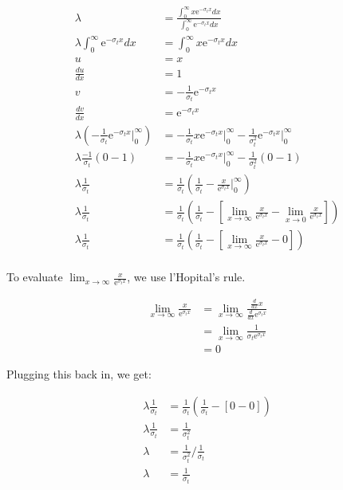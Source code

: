 \documentclass{hw}
\begin{document}
\solution
    \begin{align*}
        \lambda &= \frac{\int_0^\infty x \mathrm{e}^{-\sigma_t x} dx }{\int_0^\infty \mathrm{e}^{-\sigma_t x} dx} \\
        \lambda \int_0^\infty \mathrm{e}^{-\sigma_t x} dx &= \int_0^\infty x \mathrm{e}^{-\sigma_t x} dx \\
        u &= x \\
        \frac{du}{dx} &= 1 \\
        v &= -\frac{1}{\sigma_t} \mathrm{e}^{-\sigma_t x} \\
        \frac{dv}{dx} &= \mathrm{e}^{-\sigma_t x} \\
        \lambda \left(-\frac{1}{\sigma_t} \mathrm{e}^{-\sigma_t x} \Big|_0^\infty\right) &= -\frac{1}{\sigma_t} x \mathrm{e}^{-\sigma_t x}\Big|_0^\infty - \frac{1}{\sigma_t^2}\mathrm{e}^{-\sigma_t x}\Big|_0^\infty \\
        \lambda \frac{-1}{\sigma_t} \left( 0 - 1 \right) &= -\frac{1}{\sigma_t} x \mathrm{e}^{-\sigma_t x}\Big|_0^\infty - \frac{1}{\sigma_t^2} \left( 0 - 1 \right) \\
        \lambda \frac{1}{\sigma_t} &= \frac{1}{\sigma_t} \left( \frac{1}{\sigma_t} - \frac{x}{\mathrm{e}^{\sigma_t x}}\Big|_0^\infty \right) \\
        \lambda \frac{1}{\sigma_t} &= \frac{1}{\sigma_t} \left( \frac{1}{\sigma_t} - \left[ \lim_{x\to\infty}\frac{x}{\mathrm{e}^{\sigma_t x}} - \lim_{x\to0}\frac{x}{\mathrm{e}^{\sigma_t x}} \right] \right) \\
        \lambda \frac{1}{\sigma_t} &= \frac{1}{\sigma_t} \left( \frac{1}{\sigma_t} - \left[ \lim_{x\to\infty}\frac{x}{\mathrm{e}^{\sigma_t x}} - 0 \right] \right) \\
    \end{align*}

    To evaluate $\lim_{x\to\infty}\frac{x}{\mathrm{e}^{\sigma_t x}}$, we use l'Hopital's rule.

    \begin{align*}
        \lim_{x\to\infty}\frac{x}{\mathrm{e}^{\sigma_t x}} &= \lim_{x\to\infty}\frac{\frac{d}{dx}x}{\frac{d}{dx}\mathrm{e}^{\sigma_t x}} \\
        &= \lim_{x\to\infty}\frac{1}{\sigma_t \mathrm{e}^{\sigma_t x}} \\
        &= 0
    \end{align*}

    Plugging this back in, we get:

    \begin{align*}
        \lambda \frac{1}{\sigma_t} &= \frac{1}{\sigma_t} \left( \frac{1}{\sigma_t} - \left[ 0 - 0 \right] \right) \\
        \lambda \frac{1}{\sigma_t} &= \frac{1}{\sigma_t^2} \\
        \lambda &= {\frac{1}{\sigma_t^2}} / {\frac{1}{\sigma_t}} \\
        \lambda &= \frac{1}{\sigma_t}
    \end{align*}
\end{document}
